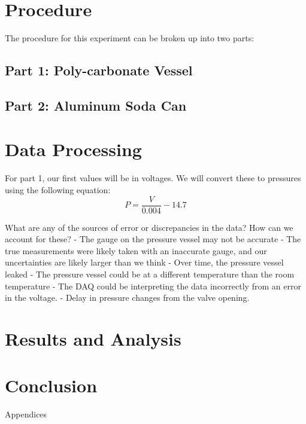 \documentclass{article}
\begin{document}
\pagebreak

\section{Procedure}
The procedure for this experiment can be broken up into two parts:
\subsection{Part 1: Poly-carbonate Vessel}

\subsection{Part 2: Aluminum Soda Can}

\section{Data Processing}

For part 1, our first values will be in voltages. We will convert these to pressures using the following equation:
\[
P = \frac{V}{0.004} - 14.7
\]

What are any of the sources of error or discrepancies in the data? How can we account for these?
- The gauge on the pressure vessel may not be accurate
- The true measurements were likely taken with an inaccurate gauge, and our uncertainties are likely larger than we think
- Over time, the pressure vessel leaked
- The pressure vessel could be at a different temperature than the room temperature
- The DAQ could be interpreting the data incorrectly from an error in the voltage.
- Delay in pressure changes from the valve opening.


\section{Results and Analysis}

\section{Conclusion}

\newpage
\thispagestyle{empty}  %
\begin{center}
	\vspace*{\fill}
	{\Huge Appendices}
	\vspace*{\fill}
\end{center}
\end{document}
